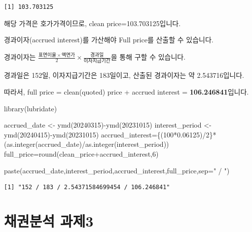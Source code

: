 \documentclass[
  a4paper,
  DIV=11,
  numbers=noendperiod]{scrreprt}
\newenvironment{Shaded}{\begin{snugshade}}{\end{snugshade}}
\newcommand{\AttributeTok}[1]{\textcolor[rgb]{0.40,0.45,0.13}{#1}}
\newcommand{\DecValTok}[1]{\textcolor[rgb]{0.68,0.00,0.00}{#1}}
\newcommand{\FloatTok}[1]{\textcolor[rgb]{0.68,0.00,0.00}{#1}}
\newcommand{\FunctionTok}[1]{\textcolor[rgb]{0.28,0.35,0.67}{#1}}
\newcommand{\NormalTok}[1]{\textcolor[rgb]{0.00,0.23,0.31}{#1}}
\newcommand{\OtherTok}[1]{\textcolor[rgb]{0.00,0.23,0.31}{#1}}
\newcommand{\SpecialCharTok}[1]{\textcolor[rgb]{0.37,0.37,0.37}{#1}}
\newcommand{\StringTok}[1]{\textcolor[rgb]{0.13,0.47,0.30}{#1}}
\begin{document}
\begin{verbatim}
[1] 103.703125
\end{verbatim}

해당 가격은 호가가격이므로, clean price=103.703125입니다.

경과이자(accrued interest)를 가산해야 Full price를 산출할 수 있습니다.

경과이자는
\(\frac{표면이율 \times 액면가}{2}\times \frac{경과일}{이자지급기간}\)을
통해 구할 수 있습니다.

경과일은 152일, 이자지급기간은 183일이고, 산출된 경과이자는 약
2.543716입니다.

따라서, full price = clean(quoted) price + accrued interest =
\textbf{106.246841}입니다.

\begin{Shaded}
\begin{Highlighting}[]
\FunctionTok{library}\NormalTok{(lubridate)}

\NormalTok{accrued\_date }\OtherTok{\textless{}{-}} \FunctionTok{ymd}\NormalTok{(}\DecValTok{20240315}\NormalTok{)}\SpecialCharTok{{-}}\FunctionTok{ymd}\NormalTok{(}\DecValTok{20231015}\NormalTok{)}
\NormalTok{interest\_period }\OtherTok{\textless{}{-}} \FunctionTok{ymd}\NormalTok{(}\DecValTok{20240415}\NormalTok{)}\SpecialCharTok{{-}}\FunctionTok{ymd}\NormalTok{(}\DecValTok{20231015}\NormalTok{)}
\NormalTok{accrued\_interest}\OtherTok{=}\NormalTok{\{(}\DecValTok{100}\SpecialCharTok{*}\FloatTok{0.06125}\NormalTok{)}\SpecialCharTok{/}\DecValTok{2}\NormalTok{\}}\SpecialCharTok{*}\NormalTok{(}\FunctionTok{as.integer}\NormalTok{(accrued\_date)}\SpecialCharTok{/}\FunctionTok{as.integer}\NormalTok{(interest\_period))}
\NormalTok{full\_price}\OtherTok{=}\FunctionTok{round}\NormalTok{(clean\_price}\SpecialCharTok{+}\NormalTok{accrued\_interest,}\DecValTok{6}\NormalTok{)}

\FunctionTok{paste}\NormalTok{(accrued\_date,interest\_period,accrued\_interest,full\_price,}\AttributeTok{sep=}\StringTok{" / "}\NormalTok{)}
\end{Highlighting}
\end{Shaded}

\begin{verbatim}
[1] "152 / 183 / 2.54371584699454 / 106.246841"
\end{verbatim}

\chapter*{채권분석 과제3}\label{uxcc44uxad8cuxbd84uxc11d-uxacfcuxc81c3}
\end{document}
